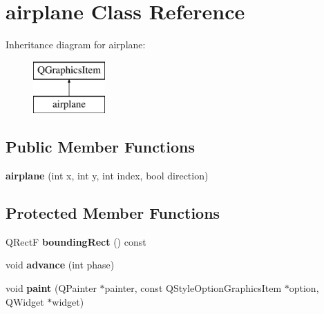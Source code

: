 \hypertarget{classairplane}{\section{airplane Class Reference}
\label{classairplane}
}
Inheritance diagram for airplane\-:\begin{figure}[H]
\begin{center}
\leavevmode
\includegraphics[height=2.000000cm]{classairplane}
\end{center}
\end{figure}
\subsection*{Public Member Functions}
\begin{DoxyCompactItemize}
\item 
\hypertarget{classairplane_a4a004bccf8aecf7d742e0ae486c2a47b}{{\bfseries airplane} (int x, int y, int index, bool direction)}\label{classairplane_a4a004bccf8aecf7d742e0ae486c2a47b}

\end{DoxyCompactItemize}
\subsection*{Protected Member Functions}
\begin{DoxyCompactItemize}
\item 
\hypertarget{classairplane_acaa146bc978062536a9a384c56a8fd5a}{Q\-Rect\-F {\bfseries bounding\-Rect} () const }\label{classairplane_acaa146bc978062536a9a384c56a8fd5a}

\item 
\hypertarget{classairplane_a1f949d8bd0bf33b6368859617845a4c0}{void {\bfseries advance} (int phase)}\label{classairplane_a1f949d8bd0bf33b6368859617845a4c0}

\item 
\hypertarget{classairplane_a48ceb331135cb573b903ebf168f108ac}{void {\bfseries paint} (Q\-Painter $\ast$painter, const Q\-Style\-Option\-Graphics\-Item $\ast$option, Q\-Widget $\ast$widget)}\label{classairplane_a48ceb331135cb573b903ebf168f108ac}

\end{DoxyCompactItemize}
